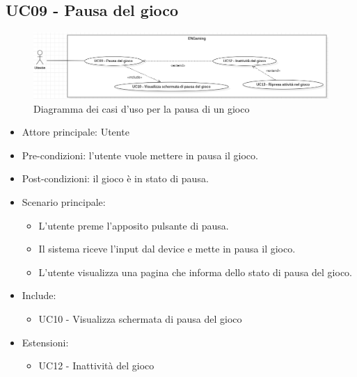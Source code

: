 \subsection{UC09 - Pausa del gioco}
\begin{figure}[h]
    \centering
    \includegraphics[width=400pt]{images/usecase/UC09.png}
    \caption{Diagramma dei casi d'uso per la pausa di un gioco}
    \label{fig:UC09}
\end{figure}
\begin{itemize}
    \item Attore principale: Utente
    \item Pre-condizioni: l'utente vuole mettere in pausa il gioco.
    \item Post-condizioni: il gioco è in stato di pausa.
    \item Scenario principale: \begin{itemize}
        \item L'utente preme l'apposito pulsante di pausa.
        \item Il sistema riceve l'input dal device e mette in pausa il gioco.
        \item L'utente visualizza una pagina che informa dello stato di pausa del gioco.
    \end{itemize}
    \item Include: \begin{itemize}
        \item UC10 - Visualizza schermata di pausa del gioco
    \end{itemize}
    \item Estensioni: \begin{itemize}
        \item UC12 - Inattività del gioco
    \end{itemize}
\end{itemize}
\newpage
